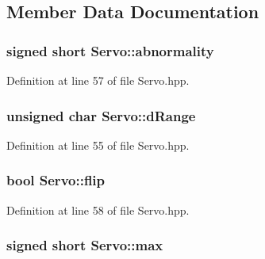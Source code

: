\subsection{Member Data Documentation}
\subsubsection[{\texorpdfstring{abnormality}{abnormality}}]{\setlength{\rightskip}{0pt plus 5cm}signed short Servo\+::abnormality\hspace{0.3cm}{\ttfamily [private]}}\hypertarget{struct_servo_a65a5e86b2f31ec2a9c115e818a1ea703}{}\label{struct_servo_a65a5e86b2f31ec2a9c115e818a1ea703}


Definition at line 57 of file Servo.\+hpp.

\subsubsection[{\texorpdfstring{d\+Range}{dRange}}]{\setlength{\rightskip}{0pt plus 5cm}unsigned char Servo\+::d\+Range\hspace{0.3cm}{\ttfamily [private]}}\hypertarget{struct_servo_a534d23b4cf1dcdd677dfa503101c50a0}{}\label{struct_servo_a534d23b4cf1dcdd677dfa503101c50a0}


Definition at line 55 of file Servo.\+hpp.

\subsubsection[{\texorpdfstring{flip}{flip}}]{\setlength{\rightskip}{0pt plus 5cm}bool Servo\+::flip\hspace{0.3cm}{\ttfamily [private]}}\hypertarget{struct_servo_a4b94c914128a9965e264f0be608fb6a7}{}\label{struct_servo_a4b94c914128a9965e264f0be608fb6a7}


Definition at line 58 of file Servo.\+hpp.

\subsubsection[{\texorpdfstring{max}{max}}]{\setlength{\rightskip}{0pt plus 5cm}signed short Servo\+::max}\hypertarget{struct_servo_a20a1e16e912d613a6f7ee07072799f6d}{}\label{struct_servo_a20a1e16e912d613a6f7ee07072799f6d}


